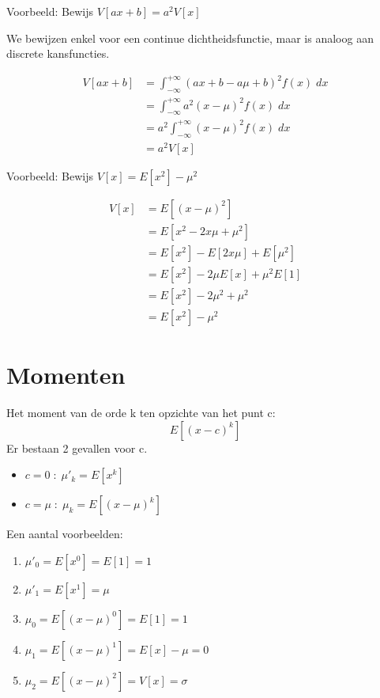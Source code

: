 \documentclass[12pt]{report}
\newcommand{\example}[2]{
      \hrulefill
      
      Voorbeeld: #1
      
      #2
      
      \hrulefill
  }
\begin{document}
\example{Bewijs $V[ax + b] = a^2V[x]$}{
We bewijzen enkel voor een continue dichtheidsfunctie, maar is analoog aan discrete kansfuncties.

\begin{equation*}
 \begin{split}
  V[ax + b] & = \int_{-\infty}^{+\infty}(ax + b - a\mu + b)^2 f(x)\; dx \\
            & = \int_{-\infty}^{+\infty}a^2(x - \mu)^2 f(x)\; dx \\
            & = a^2\int_{-\infty}^{+\infty}(x - \mu)^2 f(x)\; dx \\
            & = a^2V[x]
 \end{split}
\end{equation*}
}
\example{Bewijs $V[x] = E[x^2] - \mu^2$}{
\begin{equation*}
 \begin{split}
  V[x] & = E[(x - \mu)^2] \\
       & = E[x^2 - 2x\mu + \mu^2] \\
       & = E[x^2] - E[2x\mu] + E[\mu^2] \\
       & = E[x^2] - 2\mu E[x] + \mu^2E[1] \\
       & = E[x^2] - 2\mu^2 + \mu^2 \\
       & = E[x^2] - \mu^2
 \end{split}
\end{equation*}


}

\section{Momenten}
Het moment van de orde k ten opzichte van het punt c:
$$E[(x - c)^k]$$
Er bestaan 2 gevallen voor c.
\begin{itemize}
 \item $c = 0\;:\; \mu'_{k} = E[x^k]$
 \item $c = \mu \;:\; \mu_k = E[(x - \mu)^k]$
\end{itemize}
Een aantal voorbeelden:
\begin{enumerate}
 \item $\mu'_0 = E[x^0] = E[1] = 1$
 \item $\mu'_1 = E[x^1] = \mu$
 \item $\mu_0 = E[(x - \mu)^0] = E[1] = 1$
 \item $\mu_1 = E[(x - \mu)^1] = E[x] - \mu = 0$
 \item $\mu_2 = E[(x - \mu)^2] = V[x] = \sigma$
\end{enumerate}
\end{document}
